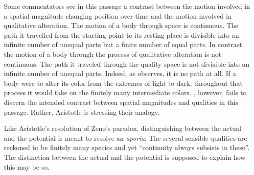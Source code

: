 Some commentators see in this passage a contrast between the motion involved in a spatial magnitude changing position over time and the motion involved in qualitative alteration. The motion of a body through space is continuous. The path it travelled from the starting point to its resting place is divisible into an infinite number of unequal parts but a finite number of equal parts. In contrast the motion of a body through the process of qualitative alteration is not continuous. The path it traveled through the quality space is not divisible into an infinite number of unequal parts. Indeed, as \citet[395-396]{Sherry:1986uq} observes, it is no path at all. If a body were to alter its color from the extremes of light to dark, throughout that process it would take on the finitely many intermediate colors. \citet[128--129]{White:2002kx}, however, fails to discern the intended contrast between spatial magnitudes and qualities in this passage. Rather, Aristotle is stressing their analogy.

Like Aristotle's resolution of Zeno's paradox, distinguishing between the actual and the potential is meant to resolve an \emph{aporia}: The several sensible qualities are reckoned to be finitely many species and yet ``continuity always subsists in these''. The distinction between the actual and the potential is supposed to explain how this may be so. 

